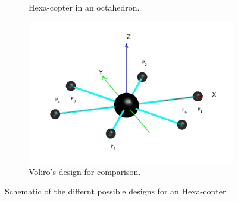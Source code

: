 \begin{figure}[!h]
{\begin{subfigure}[b]{0.5\textwidth}
    \caption{Hexa-copter in an octahedron.} \label{fig:Hexacopter_resultb}
  \end{subfigure}
  \hspace*{\fill} %
  \begin{subfigure}[b]{0.7\textwidth}
    \includegraphics[width=\linewidth]{images/Voliro.jpg}
    \caption{Voliro's design for comparison.} \label{fig:Hexacopter_resultc}
  \end{subfigure}}
  \caption{Schematic of the differnt possible designs for an Hexa-copter.}
  \label{fig:Hexacopter_result}
\end{figure}

